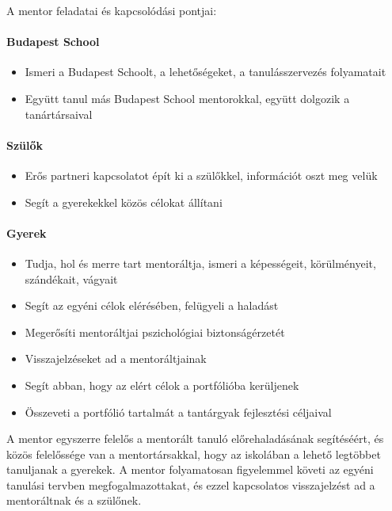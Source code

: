   A mentor feladatai és kapcsolódási pontjai:

  \paragraph{Budapest School}
  \begin{itemize}
    \item Ismeri a Budapest Schoolt, a lehetőségeket, a tanulásszervezés folyamatait
    \item Együtt tanul más Budapest School mentorokkal, együtt dolgozik a tanártársaival
  \end{itemize}

  \paragraph{Szülők}
  \begin{itemize}
    \item Erős partneri kapcsolatot épít ki a szülőkkel, információt oszt meg velük
    \item Segít a gyerekekkel közös célokat állítani
\end{itemize}

  \paragraph{Gyerek}

  \begin{itemize}
    \item  Tudja, hol és merre tart mentoráltja, ismeri a képességeit, körülményeit, szándékait, vágyait
    \item    Segít az egyéni célok elérésében, felügyeli a haladást
    \item    Megerősíti mentoráltjai pszichológiai biztonságérzetét
    \item   Visszajelzéseket ad a mentoráltjainak
    \item    Segít abban, hogy az elért célok a portfólióba kerüljenek
    \item    Összeveti a portfólió tartalmát a tantárgyak fejlesztési céljaival
\end{itemize}


  A mentor egyszerre felelős a mentorált tanuló előrehaladásának segítéséért, és
  közös felelőssége van a mentortársakkal, hogy az iskolában a lehető legtöbbet
  tanuljanak a gyerekek. A mentor folyamatosan figyelemmel követi az egyéni
  tanulási tervben megfogalmazottakat, és ezzel kapcsolatos visszajelzést ad a
  mentoráltnak és a szülőnek.


